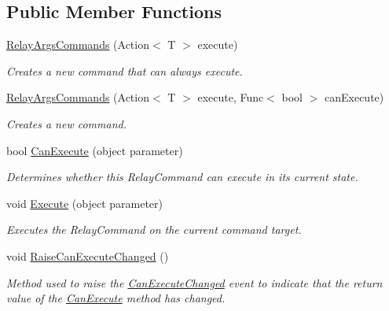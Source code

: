 \subsection*{Public Member Functions}
\begin{DoxyCompactItemize}
\item 
\mbox{\hyperlink{class_r_f_storage_1_1_relay_commands_1_1_relay_args_commands_a82cc465e0965b5add1e7601b15cca6f6}{Relay\+Args\+Commands}} (Action$<$ T $>$ execute)
\begin{DoxyCompactList}\small\item\em Creates a new command that can always execute. \end{DoxyCompactList}\item 
\mbox{\hyperlink{class_r_f_storage_1_1_relay_commands_1_1_relay_args_commands_a67d2f49983ad0072e54d86f827f228ba}{Relay\+Args\+Commands}} (Action$<$ T $>$ execute, Func$<$ bool $>$ can\+Execute)
\begin{DoxyCompactList}\small\item\em Creates a new command. \end{DoxyCompactList}\item 
bool \mbox{\hyperlink{class_r_f_storage_1_1_relay_commands_1_1_relay_args_commands_a2c2ee8921125d98ddae9f72e26b9f589}{Can\+Execute}} (object parameter)
\begin{DoxyCompactList}\small\item\em Determines whether this Relay\+Command can execute in its current state. \end{DoxyCompactList}\item 
void \mbox{\hyperlink{class_r_f_storage_1_1_relay_commands_1_1_relay_args_commands_aed116bf39b06cdb99782ea420193c5af}{Execute}} (object parameter)
\begin{DoxyCompactList}\small\item\em Executes the Relay\+Command on the current command target. \end{DoxyCompactList}\item 
void \mbox{\hyperlink{class_r_f_storage_1_1_relay_commands_1_1_relay_args_commands_a357c2ddda1853ab7004ad0a59eda5e64}{Raise\+Can\+Execute\+Changed}} ()
\begin{DoxyCompactList}\small\item\em Method used to raise the \mbox{\hyperlink{class_r_f_storage_1_1_relay_commands_1_1_relay_args_commands_a601b27519b427e6bc1d70dbb27e30554}{Can\+Execute\+Changed}} event to indicate that the return value of the \mbox{\hyperlink{class_r_f_storage_1_1_relay_commands_1_1_relay_args_commands_a2c2ee8921125d98ddae9f72e26b9f589}{Can\+Execute}} method has changed. \end{DoxyCompactList}\end{DoxyCompactItemize}
